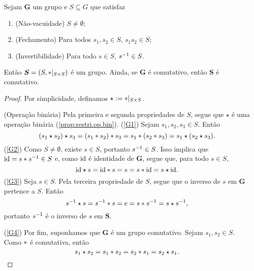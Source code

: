 \begin{prop}
\label{alge:prop.subgru}
Sejam $\bm G$ um grupo e $S \subseteq G$ que satisfaz
	\begin{enumerate}[label=\textbf{SG\arabic*.},ref={SG\arabic*}]
	\item \label{SG1} (Não-vacuidade) $S \neq \emptyset$;
	\item \label{SG2} (Fechamento) Para todos $s_1,s_2 \in S$, $s_1s_2 \in S$;
	\item \label{SG3} (Invertibilidade) Para todo $s \in S$,  $s^{-1} \in S$.
	\end{enumerate}	
\noindent
Então $\bm S=(S,\ast|_{S \times S})$ é um grupo. Ainda, se $\bm G$ é comutativo, então $\bm S$ é comutativo.
\end{prop}
\begin{proof}
Por simplicidade, definamos $\star := \ast|_{S \times S}$.


(Operação binária) Pela primeira e segunda propriedades de $S$, segue que $\star$ é uma operação binária (\ref{prop:restri.op.bin}).
(\ref{G1}) Sejam $s_1,s_2,s_3 \in S$. Então
	\begin{equation*}
	(s_1 \star s_2) \star s_3 = (s_1 \ast s_2) \ast s_3 = s_1 \ast (s_2 \ast s_3) = s_1 \star (s_2 \star s_3).
	\end{equation*}
(\ref{G2}) Como $S \neq \emptyset$, existe $s \in S$, portanto $s^{-1} \in S$. Isso implica que $\mathrm{id}=s \ast s^{-1} \in S$ e, como $\mathrm{id}$ é identidade de $\bm G$, segue que, para todo $s \in S$,
	\begin{equation*}
	\mathrm{id} \star s = \mathrm{id} \ast s = s = s \ast \mathrm{id} = s \star \mathrm{id}.
	\end{equation*}
(\ref{G3}) Seja $s \in S$. Pela terceira propriedade de $S$, segue que o inverso de $s$ em $\bm G$ pertence a $S$. Então
	\begin{equation*}
	s^{-1} \star s = s^{-1} \ast s = e = s \ast s^{-1} = s \star s^{-1},
	\end{equation*}
portanto $s^{-1}$ é o inverso de $s$ em $\bm S$.

(\ref{G4}) Por fim, suponhamos que $\bm G$ é um grupo comutativo. Sejam $s_1,s_2 \in S$. Como $\ast$ é comutativa, então
	\begin{equation*}
	s_1 \star s_2 = s_1 \ast s_2 = s_2 \ast s_1 = s_2 \star s_1.
	\end{equation*}
\end{proof}

